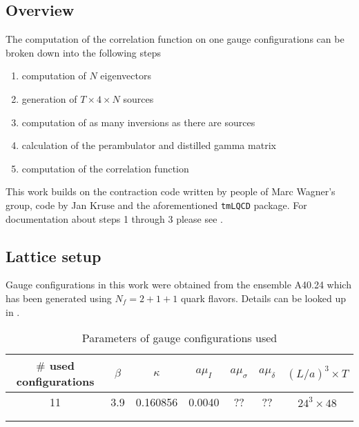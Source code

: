 \subsection{Overview}
    The computation of the correlation function on one gauge configurations can be broken down into the following steps
    \begin{enumerate}
        \item computation of $N$ eigenvectors
        \item generation of $T \times 4 \times N$ sources
        \item computation of as many inversions as there are sources
        \item calculation of the perambulator and distilled gamma matrix
        \item computation of the correlation function
    \end{enumerate}
    This work builds on the contraction code written by people of Marc Wagner's group, code by Jan Kruse and the aforementioned \verb+tmLQCD+ package. For documentation about steps 1 through 3 please see \cite{bachelor_thesis_jan}.

\subsection{Lattice setup} %
    Gauge configurations in this work were obtained from the ensemble A40.24 which has been generated using $N_f = 2 + 1 + 1$ quark flavors. Details can be looked up in \cite{guage_configurations}.
    
    \begin{table}[h]
        \centering
        \begin{tabular}{lllllll}
        \hline
        \multicolumn{1}{|c|}{$\#$ used configurations} & \multicolumn{1}{c|}{$\beta$} & \multicolumn{1}{c|}{$\kappa$} & \multicolumn{1}{c|}{$a\mu_I$} & \multicolumn{1}{c|}{$a\mu_\sigma$} & \multicolumn{1}{c|}{$a\mu_\delta$} & \multicolumn{1}{c|}{$(L/a)^3 \times T$} \\ \hline
        \multicolumn{1}{|c|}{11} & \multicolumn{1}{c|}{3.9} & \multicolumn{1}{c|}{0.160856} & \multicolumn{1}{c|}{0.0040} & \multicolumn{1}{c|}{??} & \multicolumn{1}{c|}{??} & \multicolumn{1}{c|}{$24^3 \times 48$} \\ \hline
                               &                       &                       &                       &                       &                       &                       \\
                               &                       &                       &                       &                       &                       &                      
        \end{tabular}
        \caption{Parameters of gauge configurations used}
        \label{table_gauge_params}
    \end{table}

